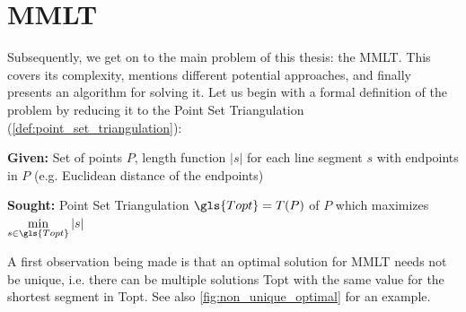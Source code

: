 \chapter{\texorpdfstring{\glsdesc{MMLT}}{MMLT}}
\label{cha:mmlt}
Subsequently, we get on to the main problem of this thesis: the
\gls{MMLT}. This  covers its complexity, mentions
different potential approaches, and finally presents an algorithm
for solving it. Let us begin with a formal definition of the problem
by reducing it to the Point Set Triangulation
(\cref{def:point_set_triangulation}):

\begin{problem}
  \label{prob:mmlt}\hfill
  \begin{labeling}{\hspace{4em}}
    \item[\textbf{Given:}]
      Set of points \(P\), length function \(|s|\)
      for each line segment \(s\) with endpoints in \(P\)
      (e.g. Euclidean distance of the endpoints)
    \item[\textbf{Sought:}]
      Point Set Triangulation \(\gls{Topt} = T(P)\) of \(P\)
      which maximizes \(\min\limits_{s\in \gls{Topt}} |s|\)
  \end{labeling}
\end{problem}

A first observation being made is that an optimal solution for
\gls{MMLT} needs not be unique, i.e. there can be multiple solutions
\gls{Topt} with the same value for the shortest segment in \gls{Topt}.
See also \cref{fig:non_unique_optimal} for an example.

